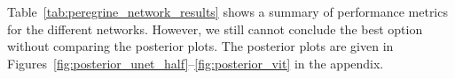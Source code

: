 Table~\ref{tab:peregrine_network_results} shows a summary of performance metrics for the different networks. However, we still cannot conclude the best option without comparing the posterior plots. The posterior plots are given in Figures~\ref{fig:posterior_unet_half}--\ref{fig:posterior_vit} in the appendix.




